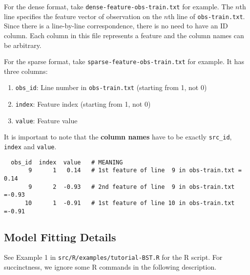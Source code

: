 \documentclass[10pt]{article}
\begin{document}
For the dense format, take {\tt dense-feature-obs-train.txt} for example.  The $n$th line specifies the feature vector of observation on the $n$th line of {\tt obs-train.txt}.  Since there is a line-by-line correspondence, there is no need to have an ID column.  Each column in this file represents a feature and the column names can be arbitrary.

For the sparse format, take {\tt sparse-feature-obs-train.txt} for example.  It has three columns:
\begin{enumerate}
\item {\tt obs\_id}: Line number in {\tt obs-train.txt} (starting from 1, not 0)
\item {\tt index}: Feature index (starting from 1, not 0)
\item {\tt value}: Feature value
\end{enumerate}
It is important to note that the {\bf column names} have to be exactly {\tt src\_id}, {\tt index} and {\tt value}.
{\small\begin{verbatim}
  obs_id  index  value   # MEANING
       9      1   0.14   # 1st feature of line  9 in obs-train.txt = 0.14
       9      2  -0.93   # 2nd feature of line  9 in obs-train.txt =-0.93
      10      1  -0.91   # 1st feature of line 10 in obs-train.txt =-0.91
\end{verbatim}}



\subsection{Model Fitting Details}
\label{sec:fitting}

See Example 1 in {\tt src/R/examples/tutorial-BST.R} for the R script.  For succinctness, we ignore some R commands in the following description.
\end{document}
